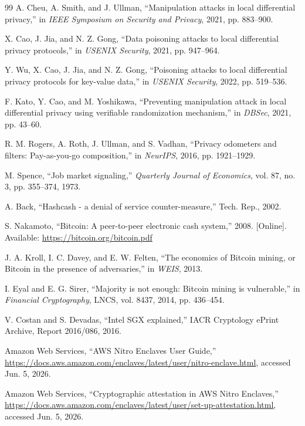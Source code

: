 \documentclass[conference]{IEEEtran}
\begin{document}
\begin{thebibliography}{99}
A. Cheu, A. Smith, and J. Ullman, ``Manipulation attacks in local differential privacy,'' in \emph{IEEE Symposium on Security and Privacy}, 2021, pp. 883--900.

X. Cao, J. Jia, and N. Z. Gong, ``Data poisoning attacks to local differential privacy protocols,'' in \emph{USENIX Security}, 2021, pp. 947--964.

Y. Wu, X. Cao, J. Jia, and N. Z. Gong, ``Poisoning attacks to local differential privacy protocols for key-value data,'' in \emph{USENIX Security}, 2022, pp. 519--536.

F. Kato, Y. Cao, and M. Yoshikawa, ``Preventing manipulation attack in local differential privacy using verifiable randomization mechanism,'' in \emph{DBSec}, 2021, pp. 43--60.

R. M. Rogers, A. Roth, J. Ullman, and S. Vadhan, ``Privacy odometers and filters: Pay-as-you-go composition,'' in \emph{NeurIPS}, 2016, pp. 1921--1929.

M. Spence, ``Job market signaling,'' \emph{Quarterly Journal of Economics}, vol. 87, no. 3, pp. 355--374, 1973.

A. Back, ``Hashcash - a denial of service counter-measure,'' Tech. Rep., 2002.

S. Nakamoto, ``Bitcoin: A peer-to-peer electronic cash system,'' 2008. [Online]. Available: \url{https://bitcoin.org/bitcoin.pdf}

J. A. Kroll, I. C. Davey, and E. W. Felten, ``The economics of Bitcoin mining, or Bitcoin in the presence of adversaries,'' in \emph{WEIS}, 2013.

I. Eyal and E. G. Sirer, ``Majority is not enough: Bitcoin mining is vulnerable,'' in \emph{Financial Cryptography}, LNCS, vol. 8437, 2014, pp. 436--454.

V. Costan and S. Devadas, ``Intel SGX explained,'' IACR Cryptology ePrint Archive, Report 2016/086, 2016.

Amazon Web Services, ``AWS Nitro Enclaves User Guide,'' \url{https://docs.aws.amazon.com/enclaves/latest/user/nitro-enclave.html}, accessed Jun. 5, 2026.

Amazon Web Services, ``Cryptographic attestation in AWS Nitro Enclaves,'' \url{https://docs.aws.amazon.com/enclaves/latest/user/set-up-attestation.html}, accessed Jun. 5, 2026.


\end{thebibliography}
\end{document}
